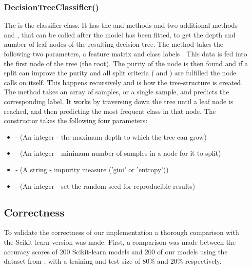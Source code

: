 \subsubsection{DecisionTreeClassifier()}
The  is the classifier class.
It has the  and  methods and two additional  methods  and , that can be called after the model has been fitted, to get the depth and number of leaf nodes of the resulting decision tree.
The  method takes the following two parameters, a feature matrix  and class labels .
This data is fed into the first node of the tree (the root).
The purity of the node is then found and if a split can improve the purity and all split criteria ( and ) are fulfilled the node calls  on itself.
This happens recursively and is how the tree-structure is created.
The  method takes an array of samples, or a single sample, and predicts the corresponding label.
It works by traversing down the tree until a leaf node is reached, and then predicting the most frequent class in that node.
The constructor takes the following four parameters:\\
\begin{itemize}
    \item {} - (An integer - the maximum depth to which the tree can grow)
    \item {} - (An integer - minimum number of samples in a node for it to split)
    \item {} - (A string - impurity measure ('gini' or 'entropy'))
    \item {} - (An integer - set the random seed for reproducible results)
    \end{itemize}
\vspace{10pt}

\subsection{Correctness}
To validate the correctness of our implementation a thorough comparison with the Scikit-learn version was made.
First, a comparison was made between the accuracy scores of 200 Scikit-learn models and 200 of our models using the  dataset from , with a training and test size of $80\%$ and $20\%$ respectively.

